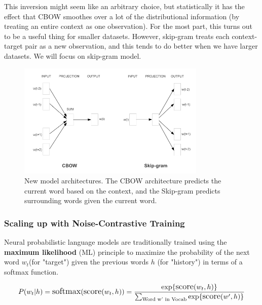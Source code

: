 This inversion might seem like an arbitrary choice, but statistically it has the effect that CBOW smoothes over a lot of the distributional information (by treating an entire context as one observation). For the most part, this turns out to be a useful thing for smaller datasets. However, skip-gram treats each context-target pair as a new observation, and this tends to do better when we have larger datasets. We will focus on skip-gram model.

 \begin{figure}[H]%
     \center%
     \includegraphics[width=0.8\textwidth]{images/amira/cbow+skip.PNG}%
     \caption[cbow and skip Models]{New model architectures. The CBOW architecture predicts the current word based on the context, and the Skip-gram predicts surrounding words given the current word.}\label{fig:cbow}%
 \end{figure}
 
\subsubsection{Scaling up with Noise-Contrastive Training}
     Neural probabilistic language models are traditionally trained using the \textbf{maximum likelihood} (ML) principle to maximize the probability of the next word ${w_t}$(for "target") given the previous words ${h}$  (for "history") in terms of a softmax function\cite{web003}\@.

 \begin{equation}
       \large
          P(w_t | h) = \text{softmax} (\text{score} (w_t, h)) \\
                     = \frac{\exp \{ \text{score} (w_t, h) \} }
                     {\sum_\text{Word w' in Vocab} \exp \{ \text{score} (w', h) \} }
 \end{equation}
 
